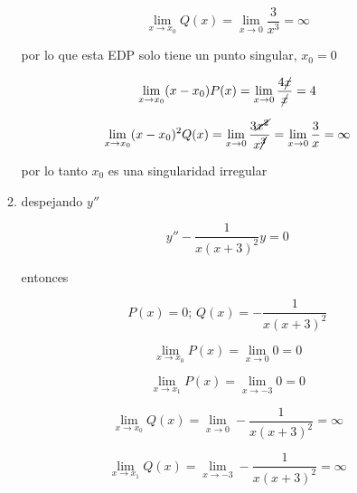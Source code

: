 \documentclass[12pt,a4paper]{article}
\begin{document}
\begin{enumerate}
\begin{enumerate}
        \begin{equation*}
            \lim_{x \rightarrow x_0}Q(x) = \lim_{x \rightarrow 0} \frac{3}{x^3} = \infty
        \end{equation*}
        
        por lo que esta EDP solo tiene un punto singular, $x_0 = 0$
        
        \begin{equation*}
            \lim_{x \rightarrow x_0}(x-x_0)P(x) = \lim_{x \rightarrow 0} \frac{4\cancel{x}}{\cancel{x}} = 4
        \end{equation*}
        
        \begin{equation*}
            \lim_{x \rightarrow x_0}(x-x_0)^2Q(x) = \lim_{x \rightarrow 0} \frac{3\cancel{x^2}}{x\cancel{^3}} = \lim_{x \rightarrow 0} \frac{3}{x}  = \infty
        \end{equation*}
        
        por lo tanto $x_0$ es una singularidad irregular
        
        
        \item despejando $y''$
        
        \begin{equation*}
            y'' - \frac{1}{x(x+3)^2} y = 0
        \end{equation*}
        
        entonces
        
        \begin{equation*}
            P(x) = 0 \text{; } Q(x) =- \frac{1}{x(x+3)^2} 
        \end{equation*}
        
        \begin{equation*}
            \lim_{x \rightarrow x_0} P(x) = \lim_{x \rightarrow 0} 0 = 0
        \end{equation*}
        
        \begin{equation*}
            \lim_{x \rightarrow x_1} P(x) = \lim_{x \rightarrow -3} 0 = 0
        \end{equation*}
        
        \begin{equation*}
            \lim_{x \rightarrow x_0} Q(x) = \lim_{x \rightarrow 0} - \frac{1}{x(x+3)^2} = \infty
        \end{equation*}
        
        \begin{equation*}
            \lim_{x \rightarrow x_1} Q(x) = \lim_{x \rightarrow -3} - \frac{1}{x(x+3)^2} = \infty
        \end{equation*}
        

\end{enumerate}
\end{enumerate}
\end{document}
